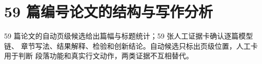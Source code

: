 \section{59 篇编号论文的结构与写作分析}

59 篇论文的自动页级候选给出篇幅与标题统计；59 张人工证据卡确认逐篇模型链、
章节写法、结果解释、检验和创新结论。自动候选只标出页级位置，人工卡用于判断
段落功能和真实行文动作，两类证据不互相替代。

